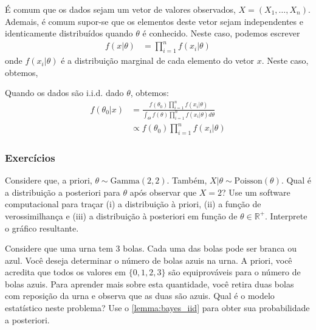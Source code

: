 É comum que os dados sejam um vetor de 
valores observados, $X=(X_{1},\ldots,X_{n})$.
Ademais, é comum supor-se que
os elementos deste vetor sejam independentes e
identicamente distribuídos quando $\theta$ é conhecido.
Neste caso, podemos escrever
\begin{align*}
 f(x|\theta)
 &= \prod_{i=1}^{n}{f(x_{i}|\theta)}
\end{align*}
onde $f(x_{i}|\theta)$ é a distribuição marginal de
cada elemento do vetor $x$. Neste caso, obtemos,
\begin{lemma}
 \label{lemma:bayes_iid}
 Quando os dados são i.i.d. dado $\theta$, obtemos:
 \begin{align*}
  f(\theta_{0}|x)
  &= \frac{f(\theta_{0})\prod_{i=1}^{n}{f(x_{i}|\theta)}}
  {\int_{\Theta}{f(\theta)\prod_{i=1}^{n}
  {f(x_{i}|\theta)}d\theta}} \\
  &\propto f(\theta_{0})\prod_{i=1}^{n}
  {f(x_{i}|\theta)}
 \end{align*}
\end{lemma}

\subsubsection*{Exercícios}

\begin{exercise}
 Considere que, a priori, 
 $\theta \sim \text{Gamma}(2,2)$.
 Também, $X|\theta \sim \text{Poisson}(\theta)$.
 Qual é a distribuição a posteriori para 
 $\theta$ após observar que $X=2$?
  Use um software computacional para traçar (i) a  distribuição à priori, (ii) a função de verossimilhança e (iii) a distribuição à posteriori
 em função de 
 $\theta \in \mathbb{R}^+$.
 Interprete o gráfico resultante.
\end{exercise}


\begin{exercise}
 \label{exercicio:urna_com_rep}
 Considere que uma urna tem $3$ bolas.
 Cada uma das bolas pode ser branca ou azul.
 Você deseja determinar o número de bolas azuis na urna.
 A priori, você acredita que 
 todos os valores em $\{0,1,2,3\}$ são 
 equiprováveis para o número de bolas azuis.
 Para aprender mais sobre esta quantidade, você 
 retira duas bolas com reposição da urna e 
 observa que as duas são azuis.
 Qual é o modelo estatístico neste problema?
 Use o \cref{lemma:bayes_iid} para 
 obter sua probabilidade a posteriori.
\end{exercise}

